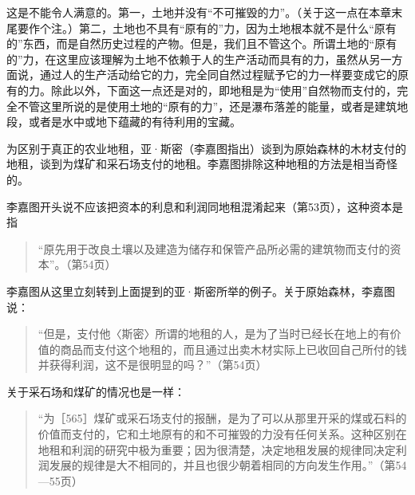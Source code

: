 这是不能令人满意的。第一，土地并没有“不可摧毁的力”。（关于这一点在本章末尾要作个注。）第二，土地也不具有“原有的”力，因为土地根本就不是什么“原有的”东西，而是自然历史过程的产物。但是，我们且不管这个。所谓土地的“原有的”力，在这里应该理解为土地不依赖于人的生产活动而具有的力，虽然从另一方面说，通过人的生产活动给它的力，完全同自然过程赋予它的力一样要变成它的原有的力。除此以外，下面这一点还是对的，即地租是为“使用”自然物而支付的，完全不管这里所说的是使用土地的“原有的力”，还是瀑布落差的能量，或者是建筑地段，或者是水中或地下蕴藏的有待利用的宝藏。

为区别于真正的农业地租，亚·斯密（李嘉图指出）谈到为原始森林的木材支付的地租，谈到为煤矿和采石场支付的地租。李嘉图排除这种地租的方法是相当奇怪的。

李嘉图开头说不应该把资本的利息和利润同地租混淆起来（第53页），这种资本是指

\begin{quote}{“原先用于改良土壤以及建造为储存和保管产品所必需的建筑物而支付的资本”。（第54页）}\end{quote}

李嘉图从这里立刻转到上面提到的亚·斯密所举的例子。关于原始森林，李嘉图说：

\begin{quote}{“但是，支付他〈斯密〉所谓的地租的人，是为了当时已经长在地上的有价值的商品而支付这个地租的，而且通过出卖木材实际上已收回自己所付的钱并获得利润，这不是很明显的吗？”（第54页）}\end{quote}

关于采石场和煤矿的情况也是一样：

\begin{quote}{“为［565］煤矿或采石场支付的报酬，是为了可以从那里开采的煤或石料的价值而支付的，它和土地原有的和不可摧毁的力没有任何关系。这种区别在地租和利润的研究中极为重要；因为很清楚，决定地租发展的规律同决定利润发展的规律是大不相同的，并且也很少朝着相同的方向发生作用。”（第54—55页）}\end{quote}

